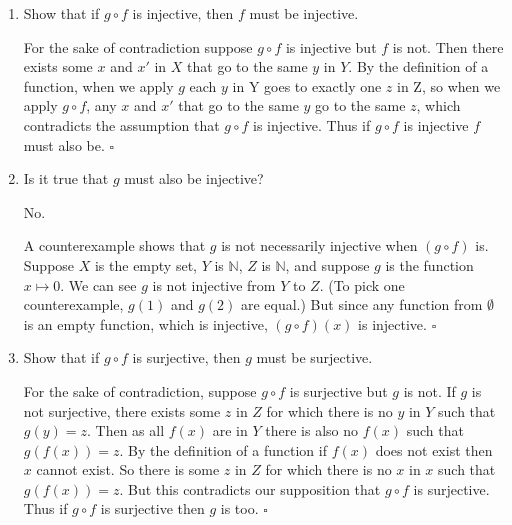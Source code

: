 \documentclass[../../main.tex]{subfiles}
\begin{document}
\begin{enumerate}
    \item
    \begin{q}
        Show that if $g \circ f$ is injective, then $f$ must be injective.
    \end{q}

    \begin{prf}
        For the sake of contradiction suppose $g \circ f$ is injective but $f$ is not.
        Then there exists some $x$ and $x'$ in $X$ that go to the same $y$ in $Y$.
        By the definition of a function, when we apply $g$ each $y$ in Y goes to exactly one $z$ in Z, so when we apply $g \circ f$, any $x$ and $x'$ that go to the same $y$ go to the same $z$, which contradicts the assumption that $g \circ f$ is injective.
        Thus if $g \circ f$ is injective $f$ must also be.
        $\square$
    \end{prf}

    \item
    \begin{q}
        Is it true that $g$ must also be injective?
    \end{q}

   \begin{ans}
     No.
   \end{ans}

    \begin{prf}
        A counterexample shows that $g$ is not necessarily injective when $(g \circ f)$ is.
        Suppose $X$ is the empty set, $Y$ is $\mathbb{N}$, $Z$ is $\mathbb{N}$, and suppose $g$ is the function $x \mapsto 0$.
        We can see $g$ is not injective from $Y$ to $Z$. (To pick one counterexample, $g(1)$ and $g(2)$ are equal.)
        But since any function from $\emptyset$ is an empty function, which is injective, $(g \circ f)(x)$ is injective.
        $\square$
    \end{prf}

    \item
    \begin{q}
        Show that if $g \circ f$ is surjective, then $g$ must be surjective.
    \end{q}

    \begin{prf}
        For the sake of contradiction, suppose $g \circ f$ is surjective but $g$ is not.
        If $g$ is not surjective, there exists some $z$ in $Z$ for which there is no $y$ in $Y$ such that $g(y)=z$.
        Then as all $f(x)$ are in $Y$ there is also no $f(x)$ such that $g(f(x))=z$.
        By the definition of a function if $f(x)$ does not exist then $x$ cannot exist.
        So there is some $z$ in $Z$ for which there is no $x$ in $x$ such that $g(f(x))=z$.
        But this contradicts our supposition that $g \circ f$ is surjective.
        Thus if $g \circ f$ is surjective then $g$ is too.
        $\square$
    \end{prf}


\end{enumerate}
\end{document}
